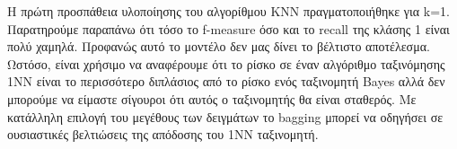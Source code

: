 Η πρώτη προσπάθεια υλοποίησης του αλγορίθμου KNN πραγματοποιήθηκε για k=1.
Παρατηρούμε παραπάνω ότι τόσο το f-measure όσο και το recall της κλάσης 1 είναι πολύ χαμηλά.
Προφανώς αυτό το μοντέλο δεν μας δίνει το βέλτιστο αποτέλεσμα.
Ωστόσο, είναι χρήσιμο να αναφέρουμε ότι το ρίσκο σε έναν αλγόριθμο ταξινόμησης 1NN είναι το περισσότερο διπλάσιος από το ρίσκο ενός ταξινομητή Bayes αλλά δεν μπορούμε να είμαστε σίγουροι ότι αυτός ο ταξινομητής θα είναι σταθερός.
Με κατάλληλη επιλογή του μεγέθους των δειγμάτων το bagging μπορεί να οδηγήσει σε ουσιαστικές βελτιώσεις της απόδοσης του 1ΝΝ ταξινομητή.

